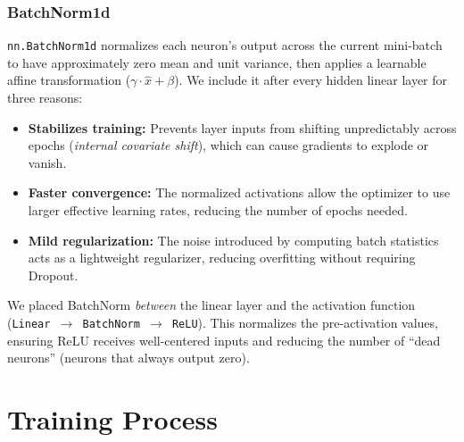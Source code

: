 \documentclass[12pt,a4paper]{article}
\begin{document}
\subsubsection{BatchNorm1d}
\texttt{nn.BatchNorm1d} normalizes each neuron's output across the current mini-batch to have approximately zero mean and unit variance, then applies a learnable affine transformation ($\gamma \cdot \hat{x} + \beta$). We include it after every hidden linear layer for three reasons:
\begin{itemize}
    \item \textbf{Stabilizes training:} Prevents layer inputs from shifting unpredictably across epochs (\textit{internal covariate shift}), which can cause gradients to explode or vanish.
    \item \textbf{Faster convergence:} The normalized activations allow the optimizer to use larger effective learning rates, reducing the number of epochs needed.
    \item \textbf{Mild regularization:} The noise introduced by computing batch statistics acts as a lightweight regularizer, reducing overfitting without requiring Dropout.
\end{itemize}

We placed BatchNorm \textit{between} the linear layer and the activation function (\texttt{Linear $\rightarrow$ BatchNorm $\rightarrow$ ReLU}). This normalizes the pre-activation values, ensuring ReLU receives well-centered inputs and reducing the number of ``dead neurons'' (neurons that always output zero).

\section{Training Process}
\end{document}
